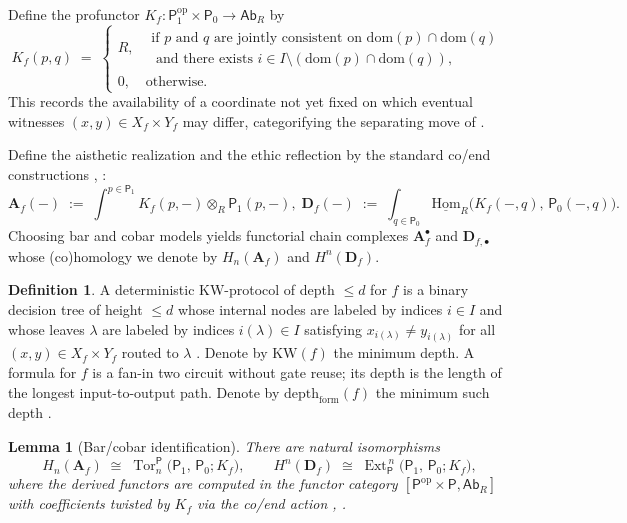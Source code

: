 \documentclass[12pt]{article}
\DeclareMathOperator{\Tor}{Tor}
\newcommand{\Ab}{\mathsf{Ab}}
\newcommand{\Ext}{\operatorname{Ext}}
\newcommand{\op}{\mathrm{op}}
\theoremstyle{plain}
\newtheorem{lemma}[theorem]{Lemma}
\theoremstyle{definition}
\newtheorem{definition}[theorem]{Definition}
\theoremstyle{remark}
\numberwithin{equation}{section}
\begin{document}
Define the profunctor $K_f:\mathsf P_1^{\op}\times \mathsf P_0\to\Ab_R$ by
\[
K_f(p,q)\;=\;
\begin{cases}
R,&\substack{\text{if $p$ and $q$ are jointly consistent on $\mathrm{dom}(p)\cap\mathrm{dom}(q)$}\\\text{ and there exists $i\in I\setminus(\mathrm{dom}(p)\cap\mathrm{dom}(q))$,}}\\
0,&\text{otherwise.}
\end{cases}
\]
This records the availability of a coordinate not yet fixed on which eventual witnesses $(x,y)\in X_f\times Y_f$ may differ, categorifying the separating move of \cite{KarchmerWigderson1990}.

Define the aisthetic realization and the ethic reflection by the standard co/end constructions \cite{MacLane1998}, \cite{Kelly1982}:
\[
\mathbf A_f(-)\;:=\;\int^{p\in \mathsf P_1} K_f(p,-)\otimes_R \mathsf P_1(p,-),
\;
\mathbf D_f(-)\;:=\;\int_{q\in \mathsf P_0}\underline{\mathrm{Hom}}_R\!\big(K_f(-,q),\,\mathsf P_0(-,q)\big).
\]
Choosing bar and cobar models yields functorial chain complexes $\mathbf A_f^\bullet$ and $\mathbf D_{f,\bullet}$ whose (co)homology we denote by $H_n(\mathbf A_f)$ and $H^n(\mathbf D_f)$.

\begin{definition}\label{def:KW-depth}
A deterministic KW-protocol of depth $\le d$ for $f$ is a binary decision tree of height $\le d$ whose internal nodes are labeled by indices $i\in I$ and whose leaves $\lambda$ are labeled by indices $i(\lambda)\in I$ satisfying $x_{i(\lambda)}\neq y_{i(\lambda)}$ for all $(x,y)\in X_f\times Y_f$ routed to $\lambda$ \cite{KarchmerWigderson1990}. Denote by $\mathrm{KW}(f)$ the minimum depth. A formula for $f$ is a fan-in two circuit without gate reuse; its depth is the length of the longest input-to-output path. Denote by $\mathrm{depth}_{\mathrm{form}}(f)$ the minimum such depth \cite{Jukna2012}.
\end{definition}

\begin{lemma}[Bar/cobar identification]\label{lem:bar-cobar}
There are natural isomorphisms
\[
H_n(\mathbf A_f)\;\cong\;\Tor^{\mathsf P}_n\!\big(\mathsf P_1,\,\mathsf P_0;K_f\big),
\qquad
H^n(\mathbf D_f)\;\cong\;\Ext^{\,n}_{\mathsf P}\!\big(\mathsf P_1,\,\mathsf P_0;K_f\big),
\]
where the derived functors are computed in the functor category $[\mathsf P^{\op}\times \mathsf P,\Ab_R]$ with coefficients twisted by $K_f$ via the co/end action \cite{Kelly1982}, \cite{Weibel1994}.
\end{lemma}
\end{document}
